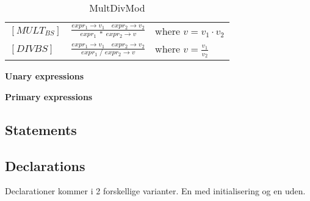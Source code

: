     \bgroup
    \def\arraystretch{3}
    \begin{table}[H]
    \centering
    \begin{tabular}{l c l}
        
        $[MULT_{BS}]$ &$\frac{expr_1 \rightarrow v_1 \quad expr_2 \rightarrow v_2}{expr_1\;*\;expr_2 \rightarrow v}$ & where $v = v_1 \cdot v_2$ \\
        
        $[DIV{BS}]$ &$\frac{expr_1 \rightarrow v_1 \quad expr_2 \rightarrow v_2}{expr_1\;/\;expr_2 \rightarrow v}$ & where $v = \frac{v_1}{v_2}$ \\
    \end{tabular}
    \caption{MultDivMod}
    \label{tab:multdivmod}
    \end{table}
    \egroup

\textbf{Unary expressions}

     
  
\textbf{Primary expressions}

    


\subsection{Statements}



\subsection{Declarations}
Declarationer kommer i 2 forskellige varianter. En med initialisering og en uden.


